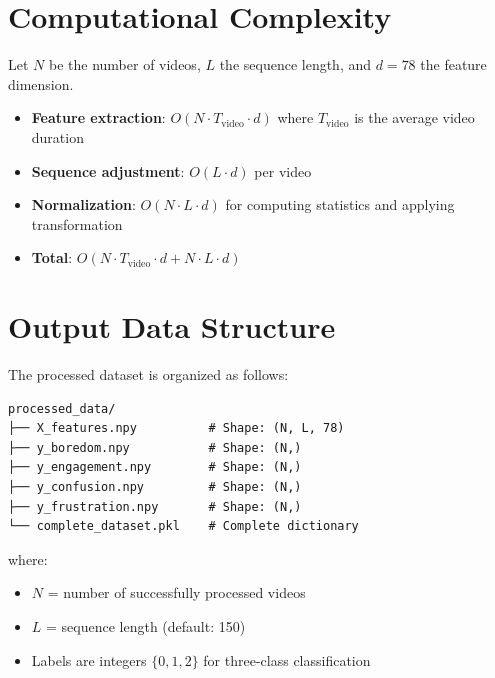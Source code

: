 \documentclass{article}
\begin{document}
\section{Computational Complexity}

Let $N$ be the number of videos, $L$ the sequence length, and $d = 78$ the feature dimension.

\begin{itemize}
    \item \textbf{Feature extraction}: $O(N \cdot T_{\text{video}} \cdot d)$ where $T_{\text{video}}$ is the average video duration
    \item \textbf{Sequence adjustment}: $O(L \cdot d)$ per video
    \item \textbf{Normalization}: $O(N \cdot L \cdot d)$ for computing statistics and applying transformation
    \item \textbf{Total}: $O(N \cdot T_{\text{video}} \cdot d + N \cdot L \cdot d)$
\end{itemize}

\section{Output Data Structure}

The processed dataset is organized as follows:

\begin{verbatim}
processed_data/
├── X_features.npy          # Shape: (N, L, 78)
├── y_boredom.npy           # Shape: (N,)
├── y_engagement.npy        # Shape: (N,)
├── y_confusion.npy         # Shape: (N,)
├── y_frustration.npy       # Shape: (N,)
└── complete_dataset.pkl    # Complete dictionary
\end{verbatim}

where:
\begin{itemize}
    \item $N$ = number of successfully processed videos
    \item $L$ = sequence length (default: 150)
    \item Labels are integers $\{0, 1, 2\}$ for three-class classification
\end{itemize}
\end{document}
